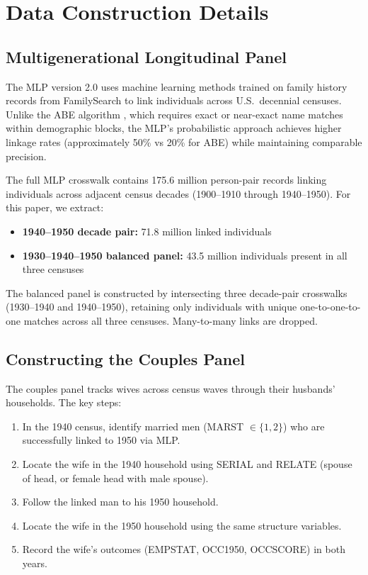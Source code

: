 \documentclass[12pt]{article}
\begin{document}
\appendix
\renewcommand{\thesection}{A\arabic{section}}
\renewcommand{\thetable}{A\arabic{table}}
\renewcommand{\thefigure}{A\arabic{figure}}

\section{Data Construction Details}
\label{app:data}

\subsection{Multigenerational Longitudinal Panel}

The MLP version 2.0 \citep{helgertz2023mlp} uses machine learning methods trained on family history records from FamilySearch to link individuals across U.S.\ decennial censuses. Unlike the ABE algorithm \citep{abramitzky2025clp}, which requires exact or near-exact name matches within demographic blocks, the MLP's probabilistic approach achieves higher linkage rates (approximately 50\% vs 20\% for ABE) while maintaining comparable precision.

The full MLP crosswalk contains 175.6 million person-pair records linking individuals across adjacent census decades (1900--1910 through 1940--1950). For this paper, we extract:

\begin{itemize}
\item \textbf{1940--1950 decade pair:} 71.8 million linked individuals
\item \textbf{1930--1940--1950 balanced panel:} 43.5 million individuals present in all three censuses
\end{itemize}

The balanced panel is constructed by intersecting three decade-pair crosswalks (1930--1940 and 1940--1950), retaining only individuals with unique one-to-one-to-one matches across all three censuses. Many-to-many links are dropped.

\subsection{Constructing the Couples Panel}

The couples panel tracks wives across census waves through their husbands' households. The key steps:

\begin{enumerate}
\item In the 1940 census, identify married men (MARST $\in \{1,2\}$) who are successfully linked to 1950 via MLP.
\item Locate the wife in the 1940 household using SERIAL and RELATE (spouse of head, or female head with male spouse).
\item Follow the linked man to his 1950 household.
\item Locate the wife in the 1950 household using the same structure variables.
\item Record the wife's outcomes (EMPSTAT, OCC1950, OCCSCORE) in both years.
\end{enumerate}
\end{document}
